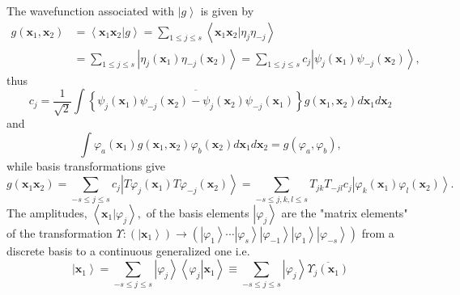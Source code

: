 \documentclass[aps,preprint]{revtex4}%
\begin{document}
The wavefunction associated with $\left\vert g\right\rangle $ is given by
\begin{align}
g\left(  \mathbf{x}_{1},\mathbf{x}_{2}\right)   &  =\left\langle \left.
\mathbf{x}_{1}\mathbf{x}_{2}\right\vert g\right\rangle =\sum_{1\leq j\leq
s}\left\langle \left.  \mathbf{x}_{1}\mathbf{x}_{2}\right\vert \eta_{j}%
\eta_{-j}\right\rangle \\
&  =\sum_{1\leq j\leq s}\left\vert \eta_{j}\left(  \mathbf{x}_{1}\right)
\eta_{-j}\left(  \mathbf{x}_{2}\right)  \right\rangle =\sum_{1\leq j\leq
s}c_{j}\left\vert \psi_{j}\left(  \mathbf{x}_{1}\right)  \psi_{-j}\left(
\mathbf{x}_{2}\right)  \right\rangle ,
\end{align}
thus%
\begin{equation}
c_{j}=\frac{1}{\sqrt{2}}\int\overline{\left\{  \psi_{j}\left(  \mathbf{x}%
_{1}\right)  \psi_{-j}\left(  \mathbf{x}_{2}\right)  -\psi_{j}\left(
\mathbf{x}_{2}\right)  \psi_{-j}\left(  \mathbf{x}_{1}\right)  \right\}
}g\left(  \mathbf{x}_{1},\mathbf{x}_{2}\right)  d\mathbf{x}_{1}d\mathbf{x}_{2}%
\end{equation}
and
\begin{equation}
\int\varphi_{a}\left(  \mathbf{x}_{1}\right)  g\left(  \mathbf{x}%
_{1},\mathbf{x}_{2}\right)  \varphi_{b}\left(  \mathbf{x}_{2}\right)
d\mathbf{x}_{1}d\mathbf{x}_{2}=g\left(  \varphi_{a},\varphi_{b}\right)  ,
\end{equation}
while basis transformations give%
\begin{equation}
g\left(  \mathbf{x}_{1}\mathbf{x}_{2}\right)  =\sum_{-s\leq j\leq s}%
c_{j}\left\vert T\varphi_{j}\left(  \mathbf{x}_{1}\right)  T\varphi
_{-j}\left(  \mathbf{x}_{2}\right)  \right\rangle =\sum_{-s\leq j,k,l\leq
s}T_{jk}T_{-jl}c_{j}\left\vert \varphi_{k}\left(  \mathbf{x}_{1}\right)
\varphi_{l}\left(  \mathbf{x}_{2}\right)  \right\rangle .\nonumber
\end{equation}
The amplitudes, $\left\langle \left.  \mathbf{x}_{1}\right\vert \varphi
_{j}\right\rangle ,$ of the basis elements $\left\vert \varphi_{j}%
\right\rangle $ are the "matrix elements" of the transformation $\Upsilon
:\left(  \left\vert \mathbf{x}_{1}\right\rangle \right)  \rightarrow\left(
\left\vert \varphi_{1}\right\rangle \cdots\left\vert \varphi_{s}\right\rangle
\left\vert \varphi_{-1}\right\rangle \left\vert \varphi_{1}\right\rangle
\left\vert \varphi_{-s}\right\rangle \right)  $ from a discrete basis to a
continuous generalized one i.e.%
\begin{equation}
\left\vert \mathbf{x}_{1}\right\rangle =\sum_{-s\leq j\leq s}\left\vert
\varphi_{j}\right\rangle \left\langle \left.  \varphi_{j}\right\vert
\mathbf{x}_{1}\right\rangle \equiv\sum_{-s\leq j\leq s}\left\vert \varphi
_{j}\right\rangle \overline{\Upsilon_{j}\left(  \mathbf{x}_{1}\right)  }%
\end{equation}
\end{document}
